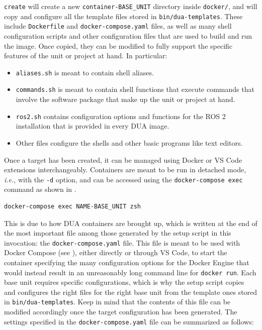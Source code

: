 \texttt{create} will create a new \texttt{container-BASE\_UNIT} directory inside \texttt{docker/}, and will copy and configure all the template files stored in \texttt{bin/dua-templates}. These include \texttt{Dockerfile} and \texttt{docker-compose.yaml} files, as well as many shell configuration scripts and other configuration files that are used to build and run the image. Once copied, they can be modified to fully support the specific features of the unit or project at hand. In particular:
\begin{itemize}
  \item \texttt{aliases.sh} is meant to contain shell aliases.
  \item \texttt{commands.sh} is meant to contain shell functions that execute commands that involve the software package that make up the unit or project at hand.
  \item \texttt{ros2.sh} contains configuration options and functions for the ROS 2 installation that is provided in every DUA image.
  \item Other files configure the shells and other basic programs like text editors.
\end{itemize}
Once a target has been created, it can be managed using Docker or VS Code extensions interchangeably. Containers are meant to be run in detached mode, \emph{i.e.}, with the \texttt{-d} option, and can be accessed using the \texttt{docker-compose exec} command as shown in .
\begin{center}
\begin{minipage}[t]{.9\textwidth}
\begin{lstlisting}[caption=Docker Compose command to open an instance of the Zsh shell inside a DUA container., label={lst:duazsh}]
docker-compose exec NAME-BASE_UNIT zsh
\end{lstlisting}
\end{minipage}
\end{center}
This is due to how DUA containers are brought up, which is written at the end of the most important file among those generated by the setup script in this invocation: the \texttt{docker-compose.yaml} file. This file is meant to be used with Docker Compose (see ), either directly or through VS Code, to start the container specifying the many configuration options for the Docker Engine that would instead result in an unreasonably long command line for \texttt{docker run}. Each base unit requires specific configurations, which is why the setup script copies and configures the right files for the right base unit from the template ones stored in \texttt{bin/dua-templates}. Keep in mind that the contents of this file can be modified accordingly once the target configuration has been generated. The settings specified in the \texttt{docker-compose.yaml} file can be summarized as follows:
